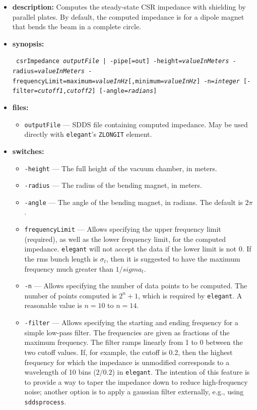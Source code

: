 \documentclass[11pt]{article}
\begin{document}
\begin{itemize}
\item {\bf description:}  Computes the steady-state CSR impedance with shielding by parallel plates.
By default, the computed impedance is for a dipole magnet that bends the beam in a complete circle.

\item {\bf synopsis:}
\begin{flushleft}{\tt
csrImpedance {{\em outputFile}  | -pipe[=out]} -height={\em valueInMeters} -radius={\em valueInMeters}
-frequencyLimit=maximum={\em valueInHz}[,minimum={\em valueInHz}] -n={\em integer} [-filter={\em cutoff1},{\em cutoff2}]
[-angle={\em radians}]
}\end{flushleft}

\item {\bf files:}
\begin{itemize}
\item {\tt outputFile} --- SDDS file containing computed impedance.  May be used directly with 
{\tt elegant}'s \verb|ZLONGIT| element.
\end{itemize}

\item {\bf switches:}
\begin{itemize}
\item {\tt -height} --- The full height of the vacuum chamber, in meters.
\item {\tt -radius} --- The radius of the bending magnet, in meters.
\item {\tt -angle} --- The angle of the bending magnet, in radians.  The default is $2\pi$.
\item {\tt frequencyLimit} --- Allows specifying the upper frequency limit (required), as well as the
 lower frequency limit, for the computed impedance.  {\tt elegant} will not accept the data if the lower
 limit is not 0.  If the rms bunch length is $\sigma_t$, then it is suggested to have the maximum frequency 
 much greater than $1/sigma_t$.
\item {\tt -n} --- Allows specifying the number of data points to be computed. The number of points computed
 is $2^n+1$, which is required by {\tt elegant}.  A reasonable value is $n=10$ to $n=14$.
\item {\tt -filter} --- Allows specifying the starting and ending frequency for a simple low-pass filter.
 The frequencies are given as fractions of the maximum frequency.  The filter ramps linearly from 1 to 0
 between the two cutoff values.  If, for example, the cutoff is 0.2, then the highest frequency for which the
 impedance is unmodified corresponds to a wavelength of 10 bins ($2/0.2$) in {\tt elegant}. The intention of
 this feature is to provide a way to taper the impedance down to reduce high-frequency noise; another option
 is to apply a gaussian filter externally, e.g., using \verb|sddsprocess|.
\end{itemize}


\end{itemize}
\end{document}
